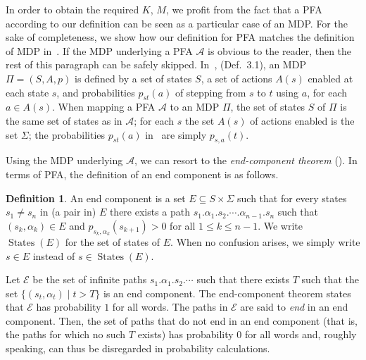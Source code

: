 \documentclass[final,3p,times,twocolumn]{elsarticle}
\theoremstyle{plain}
\theoremstyle{definition}
\newtheorem{definition}{Definition}
\newcommand{\state}{s}
\newcommand{\states}{S}
\newcommand{\alphabet}{\Sigma}
\newcommand{\sys}{\mathcal{A}}
\newcommand{\prob}[3]{p_{{#1},{#2}}(#3)}
\newcommand{\smbol}{\alpha}
\newcommand{\plength}{n}
\newcommand{\recallExternalThm}[1]{Thm.~{#1}}
\newcommand{\recallExternalDef}[1]{Def.~{#1}}
\newcommand{\st}{\mid}
\DeclareMathOperator{\statesWord}{States}
\newcommand{\stec}[1]{\statesWord({#1})}
\begin{document}
In order to obtain the required $K$, $M$, we profit from the fact that a PFA
according to our definition can be seen as a particular case of an MDP. For the
sake of completeness, we show how our definition for PFA matches the definition
of MDP in~\cite{thesis:deAlfaro}. If the MDP underlying a PFA $\sys$ is obvious
to the reader, then the rest of this paragraph can be safely skipped.
In~\cite{thesis:deAlfaro}, (\recallExternalDef{3.1}), an MDP $\Pi = (S,A,p)$
is defined by a set of states $S$, a set of actions $A(s)$ enabled at each
state $s$, and probabilities $p_{st}(a)$ of stepping from $s$ to $t$ using $a$,
for each $a \in A(s)$. When mapping a PFA $\sys$ to an MDP $\Pi$, the set of
states $S$ of $\Pi$ is the same set of states as in $\sys$; for each $s$ the
set $A(s)$ of actions enabled is the set $\alphabet$; the probabilities
$p_{st}(a)$ in~\cite{thesis:deAlfaro} are simply $\prob{s}{a}{t}$.

Using the MDP underlying $\sys$, we can resort to the \emph{end-component
theorem} (\cite[\recallExternalThm{3.2}]{thesis:deAlfaro}). In terms of PFA,
the definition of an end component is as follows.
\begin{definition}
\label{def:end-component}
An end component is a set $E \subseteq \states \times \alphabet$ such that for
every states $\state_{1} \not= \state_{\plength}$ in (a pair in) $E$ there
exists a path
$\state_{1}.\smbol_{1}.\state_{2}.\cdots.\smbol_{\plength-1}.\state_{\plength}$
such that $(\state_{k},\smbol_{k}) \in E$ and
$\prob{\state_{k}}{\smbol_{k}}{\state_{k+1}} > 0$ for all
$1 \leq k \leq \plength-1$. We write $\stec{E}$ for the set of states of $E$.
When no confusion arises, we simply write $\state \in E$ instead of
$\state \in \stec{E}$.
\end{definition}
Let $\mathcal{E}$ be the set of infinite paths
$\state_{1}.\smbol_{1}.\state_{2}.\cdots$ such that there exists $T$ such that
the set $\{ (\state_{t},\smbol_{t}) \st t > T \}$ is an end component. The
end-component theorem states that $\mathcal{E}$ has probability $1$ for all
words. The paths in $\mathcal{E}$ are said to \emph{end} in an end component.
Then, the set of paths that do not end in an end component (that is, the paths
for which no such $T$ exists) has probability $0$ for all words and, roughly
speaking, can thus be disregarded in probability calculations.
\end{document}
